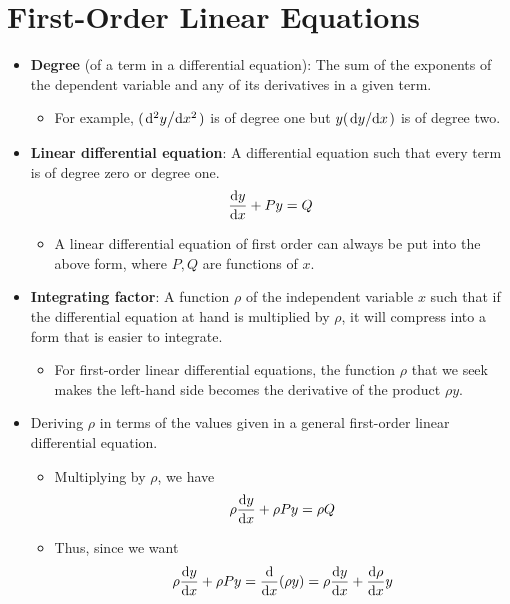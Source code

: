 \documentclass[../main.tex]{subfiles}
\begin{document}
\section{First-Order Linear Equations}
\begin{itemize}
    \item \textbf{Degree} (of a term in a differential equation): The sum of the exponents of the dependent variable and any of its derivatives in a given term.
    \begin{itemize}
        \item For example, $(\dv*[2]{y}{x})$ is of degree one but $y(\dv*{y}{x})$ is of degree two.
    \end{itemize}
    \item \textbf{Linear differential equation}: A differential equation such that every term is of degree zero or degree one.
    \begin{equation*}
        \dv{y}{x}+Py = Q
    \end{equation*}
    \begin{itemize}
        \item A linear differential equation of first order can always be put into the above form, where $P,Q$ are functions of $x$.
    \end{itemize}
    \item \textbf{Integrating factor}: A function $\rho$ of the independent variable $x$ such that if the differential equation at hand is multiplied by $\rho$, it will compress into a form that is easier to integrate.
    \begin{itemize}
        \item For first-order linear differential equations, the function $\rho$ that we seek makes the left-hand side becomes the derivative of the product $\rho y$.
    \end{itemize}
    \item Deriving $\rho$ in terms of the values given in a general first-order linear differential equation.
    \begin{itemize}
        \item Multiplying by $\rho$, we have
        \begin{equation*}
            \rho\dv{y}{x}+\rho Py = \rho Q
        \end{equation*}
        \item Thus, since we want
        \begin{equation*}
            \rho\dv{y}{x}+\rho Py = \dv{x}(\rho y) = \rho\dv{y}{x}+\dv{\rho}{x}y
        \end{equation*}

\end{itemize}
\end{itemize}
\end{document}
